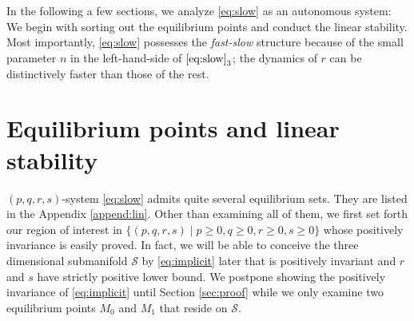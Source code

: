 \documentclass[a4paper,11pt]{article}
\theoremstyle{remark}
\begin{document}
In the following a few sections, we analyze \eqref{eq:slow} as an autonomous system: We begin with sorting out the equilibrium points and conduct the linear stability. Most importantly, \eqref{eq:slow} possesses the {\it fast-slow} structure because of the small parameter $n$ in the left-hand-side of $\eqref{eq:slow}_3$; the dynamics of $r$ can be distinctively faster than those of the rest.

\section{Equilibrium points and linear stability} \label{sec:equil}
$(p,q,r,s)$-system \eqref{eq:slow} admits quite several equilibrium sets. They are listed in the Appendix \ref{append:lin}. Other than examining all of them, we first set forth our region of interest in $\{(p,q,r,s) \; | \; p\ge0, q\ge0, r\ge0, s\ge0 \}$ whose positively invariance is easily proved. In fact, we will be able to conceive the three dimensional submanifold $\mathcal{S}$ by \eqref{eq:implicit} later that is positively invariant and $r$ and $s$ have strictly positive lower bound.%
We postpone showing the positively invariance of \eqref{eq:implicit} until Section \ref{sec:proof} while we only examine two equilibrium points $M_0$ and $M_1$ that reside on $\mathcal{S}$.
\end{document}
